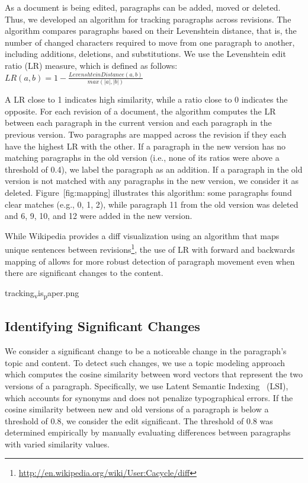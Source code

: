 As a document is being edited, paragraphs can be added, moved or
deleted. Thus, we developed an algorithm for tracking paragraphs across
revisions. The algorithm compares paragraphs based on their Levenshtein
distance, that is, the number of changed characters required to move
from one paragraph to another, including additions, deletions, and
substitutions. We use the Levenshtein edit ratio (LR) measure, which is
defined as follows:
\(LR(a,b) = 1-\frac{Levenshtein Distance(a,b)}{max(|a|,|b|)} \)

A LR close to 1 indicates high similarity, while a ratio close to 0
indicates the opposite. For each revision of a document, the algorithm
computes the LR between each paragraph in the current version and each
paragraph in the previous version. Two paragraphs are mapped across the
revision if they each have the highest LR with the other. If a paragraph
in the new version has no matching paragraphs in the old version (i.e.,
none of its ratios were above a threshold of 0.4), we label the
paragraph as an addition. If a paragraph in the old version is not
matched with any paragraphs in the new version, we consider it as
deleted. Figure~{[}fig:mapping{]} illustrates this algorithm: some
paragraphs found clear matches (e.g., 0, 1, 2), while paragraph 11 from
the old version was deleted and 6, 9, 10, and 12 were added in the new
version.

While Wikipedia provides a diff visualization using an algorithm that
maps unique sentences between revisions\footnote{\url{http://en.wikipedia.org/wiki/User:Cacycle/diff}},
the use of LR with forward and backwards mapping of allows for more
robust detection of paragraph movement even when there are significant
changes to the content.

tracking\textsubscript{v}is\textsubscript{p}aper.png

\subsection{Identifying Significant
Changes}\label{identifying-significant-changes}

We consider a significant change to be a noticeable change in the
paragraph's topic and content. To detect such changes, we use a topic
modeling approach which computes the cosine similarity between word
vectors that represent the two versions of a paragraph. Specifically, we
use Latent Semantic Indexing~\cite{deerwester1990indexing} (LSI), which
accounts for synonyms and does not penalize typographical errors. If the
cosine similarity between new and old versions of a paragraph is below a
threshold of 0.8, we consider the edit significant. The threshold of 0.8
was determined empirically by manually evaluating differences between
paragraphs with varied similarity values.

